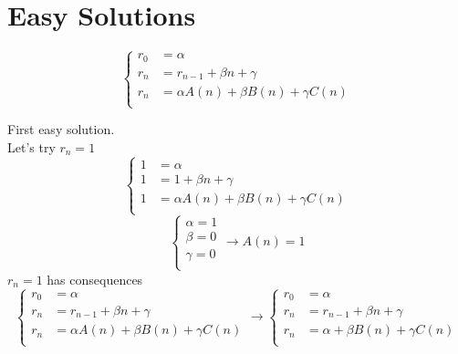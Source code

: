 \documentclass[mode=geye]{elegantnote}
\begin{document}
\section{Easy Solutions}
\begin{equation*}
    \left\{
        \begin{array}{ll}
            r_0 &= \alpha\\
            r_n &= r_{n-1}+\beta n+\gamma\\
            r_n &= \alpha A(n) + \beta B(n) + \gamma C(n)\\
        \end{array}
    \right.
\end{equation*}

First easy solution.\\
Let's try $ r_n = 1 $ 
\begin{equation*}
    \left\{
        \begin{array}{ll}
            1 &= \alpha\\
            1 &= 1+\beta n+\gamma\\
            1 &= \alpha A(n) + \beta B(n) + \gamma C(n)\\
        \end{array}
    \right.
\end{equation*}
\begin{equation*}
    \left\{
        \begin{array}{l}
            \alpha = 1\\
            \beta = 0\\
            \gamma = 0\\
        \end{array}
    \right.
    \rightarrow A(n) = 1
\end{equation*}
$ r_n=1 $ has consequences
\begin{equation*}
    \left\{
        \begin{array}{ll}
            r_0 &= \alpha\\
            r_n &= r_{n-1}+\beta n+\gamma\\
            r_n &= \alpha A(n) + \beta B(n) + \gamma C(n)\\
        \end{array}
    \right.
    \rightarrow
    \left\{
        \begin{array}{ll}
            r_0 &= \alpha\\
            r_n &= r_{n-1}+\beta n+\gamma\\
            r_n &= \alpha + \beta B(n) + \gamma C(n)\\
        \end{array}
    \right.
\end{equation*}
\end{document}

